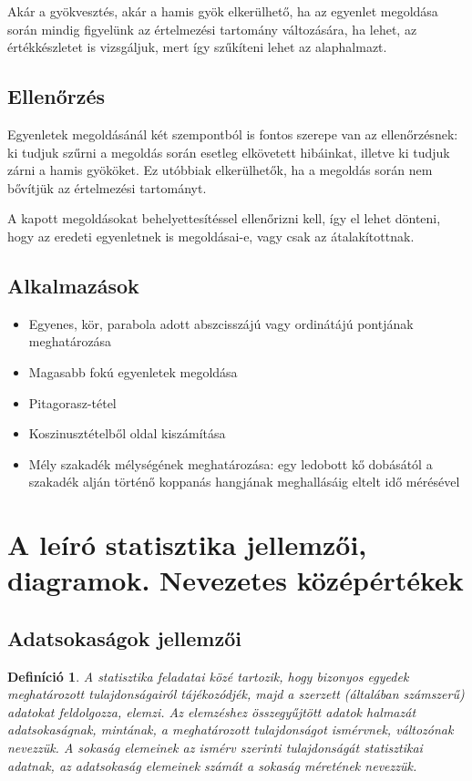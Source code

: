 \documentclass[12pt,a4paper]{article}
\newtheorem{definition}{Definíció} [section]
\begin{document}
Akár a gyökvesztés, akár a hamis gyök elkerülhető, ha az egyenlet megoldása során mindig figyelünk az értelmezési tartomány változására, ha lehet, az értékkészletet is vizsgáljuk, mert így szűkíteni lehet az alaphalmazt.

\subsection{Ellenőrzés}
Egyenletek megoldásánál két szempontból is fontos szerepe van az ellenőrzésnek: ki tudjuk szűrni a megoldás során esetleg elkövetett hibáinkat, illetve ki tudjuk zárni a hamis gyököket. Ez utóbbiak elkerülhetők, ha a megoldás során nem bővítjük az értelmezési tartományt.

A kapott megoldásokat behelyettesítéssel ellenőrizni kell, így el lehet dönteni, hogy az eredeti egyenletnek is megoldásai-e, vagy csak az átalakítottnak.

\subsection{Alkalmazások}
\begin{itemize}
\item Egyenes, kör, parabola adott abszcisszájú vagy ordinátájú pontjának meghatározása
\item Magasabb fokú egyenletek megoldása
\item Pitagorasz-tétel
\item Koszinusztételből oldal kiszámítása
\item Mély szakadék mélységének meghatározása: egy ledobott kő dobásától a szakadék alján történő koppanás hangjának meghallásáig eltelt idő mérésével
\end{itemize}

\newpage


\section{A leíró statisztika jellemzői, diagramok. Nevezetes középértékek}
\subsection{Adatsokaságok jellemzői}

\begin{definition}
A statisztika feladatai közé tartozik, hogy bizonyos egyedek meghatározott tulajdonságairól tájékozódjék, majd a szerzett (általában számszerű) adatokat feldolgozza, elemzi. Az elemzéshez összegyűjtött adatok halmazát adatsokaságnak, mintának, a meghatározott tulajdonságot ismérvnek, változónak nevezzük. A sokaság elemeinek az ismérv szerinti tulajdonságát statisztikai adatnak, az adatsokaság elemeinek számát a sokaság méretének nevezzük.
\end{definition}
\end{document}
